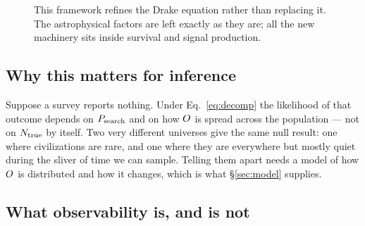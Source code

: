 \begin{figure}[tb]
\centering
{}
\caption{This framework refines the Drake equation rather than replacing it. The
astrophysical factors are left exactly as they are; all the new machinery sits
inside survival and signal production.}
\label{fig:drakemap}
\end{figure}

\subsection{Why this matters for inference}

Suppose a survey reports nothing. Under Eq.~\eqref{eq:decomp} the likelihood of
that outcome depends on $P_{\mathrm{search}}$ and on how $O$ is spread across the
population --- not on $N_{\mathrm{true}}$ by itself. Two very different universes give the
same null result: one where civilizations are rare, and one where they are
everywhere but mostly quiet during the sliver of time we can sample. Telling
them apart needs a model of how $O$ is distributed and how it changes, which
is what \S\ref{sec:model} supplies. \Established

\subsection{What observability is, and is not}

